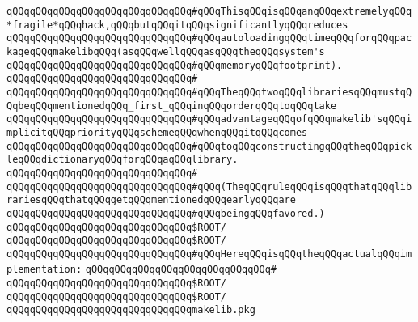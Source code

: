 \verb|qQQqqQQqqQQqqQQqqQQqqQQqqQQqqQQq#qQQqThisqQQqisqQQqanqQQqextremelyqQQq*fragile*qQQqhack,qQQqbutqQQqitqQQqsignificantlyqQQqreduces|\newline
\verb|qQQqqQQqqQQqqQQqqQQqqQQqqQQqqQQq#qQQqautoloadingqQQqtimeqQQqforqQQqpackageqQQqmakelibqQQq(asqQQqwellqQQqasqQQqtheqQQqsystem's|\newline
\verb|qQQqqQQqqQQqqQQqqQQqqQQqqQQqqQQq#qQQqmemoryqQQqfootprint).|\newline
\verb|qQQqqQQqqQQqqQQqqQQqqQQqqQQqqQQq#|\newline
\verb|qQQqqQQqqQQqqQQqqQQqqQQqqQQqqQQq#qQQqTheqQQqtwoqQQqlibrariesqQQqmustqQQqbeqQQqmentionedqQQq_first_qQQqinqQQqorderqQQqtoqQQqtake|\newline
\verb|qQQqqQQqqQQqqQQqqQQqqQQqqQQqqQQq#qQQqadvantageqQQqofqQQqmakelib'sqQQqimplicitqQQqpriorityqQQqschemeqQQqwhenqQQqitqQQqcomes|\newline
\verb|qQQqqQQqqQQqqQQqqQQqqQQqqQQqqQQq#qQQqtoqQQqconstructingqQQqtheqQQqpickleqQQqdictionaryqQQqforqQQqaqQQqlibrary.|\newline
\verb|qQQqqQQqqQQqqQQqqQQqqQQqqQQqqQQq#|\newline
\verb|qQQqqQQqqQQqqQQqqQQqqQQqqQQqqQQq#qQQq(TheqQQqruleqQQqisqQQqthatqQQqlibrariesqQQqthatqQQqgetqQQqmentionedqQQqearlyqQQqare|\newline
\verb|qQQqqQQqqQQqqQQqqQQqqQQqqQQqqQQq#qQQqbeingqQQqfavored.)|\newline
\newline
\newline
\verb|qQQqqQQqqQQqqQQqqQQqqQQqqQQqqQQq$ROOT/|\newline
\verb|qQQqqQQqqQQqqQQqqQQqqQQqqQQqqQQq$ROOT/|\newline
\newline
\verb|qQQqqQQqqQQqqQQqqQQqqQQqqQQqqQQq#qQQqHereqQQqisqQQqtheqQQqactualqQQqimplementation:|\newline
\verb|qQQqqQQqqQQqqQQqqQQqqQQqqQQqqQQq#|\newline
\verb|qQQqqQQqqQQqqQQqqQQqqQQqqQQqqQQq$ROOT/|\newline
\verb|qQQqqQQqqQQqqQQqqQQqqQQqqQQqqQQq$ROOT/|\newline
\verb|qQQqqQQqqQQqqQQqqQQqqQQqqQQqqQQqmakelib.pkg|\newline

